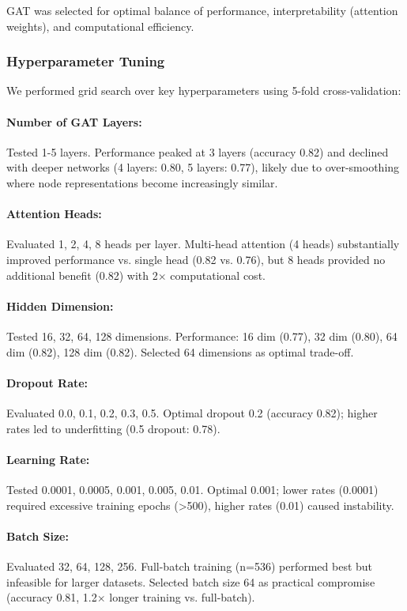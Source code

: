 \documentclass[11pt]{article}
\begin{document}
GAT was selected for optimal balance of performance, interpretability (attention weights), and computational efficiency.

\subsubsection{Hyperparameter Tuning}
We performed grid search over key hyperparameters using 5-fold cross-validation:

\paragraph{Number of GAT Layers:} Tested 1-5 layers. Performance peaked at 3 layers (accuracy 0.82) and declined with deeper networks (4 layers: 0.80, 5 layers: 0.77), likely due to over-smoothing where node representations become increasingly similar.

\paragraph{Attention Heads:} Evaluated 1, 2, 4, 8 heads per layer. Multi-head attention (4 heads) substantially improved performance vs. single head (0.82 vs. 0.76), but 8 heads provided no additional benefit (0.82) with 2$\times$ computational cost.

\paragraph{Hidden Dimension:} Tested 16, 32, 64, 128 dimensions. Performance: 16 dim (0.77), 32 dim (0.80), 64 dim (0.82), 128 dim (0.82). Selected 64 dimensions as optimal trade-off.

\paragraph{Dropout Rate:} Evaluated 0.0, 0.1, 0.2, 0.3, 0.5. Optimal dropout 0.2 (accuracy 0.82); higher rates led to underfitting (0.5 dropout: 0.78).

\paragraph{Learning Rate:} Tested 0.0001, 0.0005, 0.001, 0.005, 0.01. Optimal 0.001; lower rates (0.0001) required excessive training epochs (>500), higher rates (0.01) caused instability.

\paragraph{Batch Size:} Evaluated 32, 64, 128, 256. Full-batch training (n=536) performed best but infeasible for larger datasets. Selected batch size 64 as practical compromise (accuracy 0.81, 1.2$\times$ longer training vs. full-batch).
\end{document}
